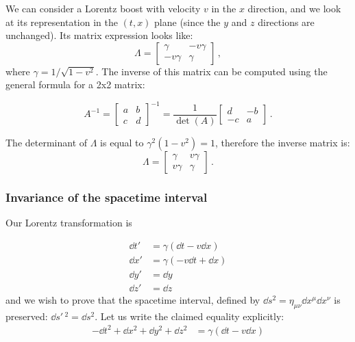 \documentclass[main.tex]{subfiles}
\begin{document}
We can consider a Lorentz boost with velocity $v$ in the $x$ direction, and we look at its representation in the $(t, x)$ plane (since the $y$ and $z$ directions are unchanged). Its matrix expression looks like:
%
\begin{equation}\label{LorBoost}
    \Lambda = \begin{bmatrix}
        \gamma & -v \gamma \\
        -v \gamma & \gamma
    \end{bmatrix}\,,
\end{equation}
%
where $\gamma = 1 / \sqrt{1 - v^2}$. The inverse of this matrix can be computed using the general formula for a 2x2 matrix:

\begin{equation}
    A^{-1}=
    \begin{bmatrix}
        a & b \\
        c & d
    \end{bmatrix}^{-1}
    =
    \frac{1}{\det(A)}
        \begin{bmatrix}
        d & -b \\
        -c & a
    \end{bmatrix}\,.
\end{equation}

The determinant of $\Lambda $ is equal to $\gamma^2 (1-v^2) = 1$, therefore the inverse matrix is:
%
\begin{equation}
    \Lambda = \begin{bmatrix}
        \gamma & v \gamma \\
        v \gamma & \gamma
    \end{bmatrix}\,.
\end{equation}

\subsubsection{Invariance of the spacetime interval}

Our Lorentz transformation is

\begin{subequations}
\begin{align}
    \dd{t}' &= \gamma (\dd{t} - v \dd{x}) \\
    \dd{x}' &= \gamma (-v\dd{t} + \dd{x}) \\
    \dd{y}' &= \dd{y} \\
    \dd{z}' &= \dd{z}
\end{align}
\end{subequations}
%
and we wish to prove that the spacetime interval, defined by $\dd{s^2} = \eta_{\mu\nu} \dd{x^\mu}\dd{x^\nu}$ is preserved: $\dd{s'\,^2} = \dd{s^2}$.
Let us write the claimed equality explicitly:
%
\begin{subequations}
\begin{align}
    -\dd{t^2} + \dd{x^2}+ \dd{y^2}+ \dd{z^2}
    &= \gamma (\dd{t} - v \dd{x})
\end{align}
\end{subequations}
\end{document}
